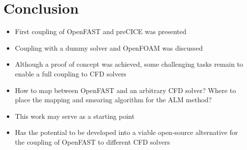 \section{Conclusion}

\begin{itemize}
	\item First coupling of OpenFAST and preCICE was presented
	\item Coupling with a dummy solver and OpenFOAM was discussed
	\item Although a proof of concept was achieved, some challenging tasks remain to enable a full coupling to CFD solvers
	\item How to map between OpenFAST and an arbitrary CFD solver? Where to place the mapping and smearing algorithm for the ALM method?
	\item This work may serve as a starting point
	\item Has the potential to be developed into a viable open-source alternative for the coupling of OpenFAST to different CFD solvers
\end{itemize}

